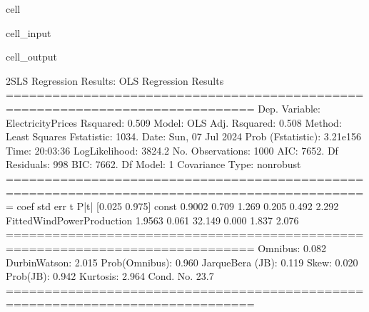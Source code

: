 \documentclass[letterpaper,10pt,english]{jupyterBook}
\begin{document}
\begin{sphinxuseclass}{cell}
\begin{sphinxVerbatimInput}
\begin{sphinxuseclass}{cell_input}
\end{sphinxuseclass}\end{sphinxVerbatimInput}
\begin{sphinxVerbatimOutput}

\begin{sphinxuseclass}{cell_output}
\begin{sphinxVerbatim}[commandchars=\\\{\}]
2SLS Regression Results:
                            OLS Regression Results                            
==============================================================================
Dep. Variable:      ElectricityPrices   R\PYGZhy{}squared:                       0.509
Model:                            OLS   Adj. R\PYGZhy{}squared:                  0.508
Method:                 Least Squares   F\PYGZhy{}statistic:                     1034.
Date:                Sun, 07 Jul 2024   Prob (F\PYGZhy{}statistic):          3.21e\PYGZhy{}156
Time:                        20:03:36   Log\PYGZhy{}Likelihood:                \PYGZhy{}3824.2
No. Observations:                1000   AIC:                             7652.
Df Residuals:                     998   BIC:                             7662.
Df Model:                           1                                         
Covariance Type:            nonrobust                                         
=============================================================================================
                                coef    std err          t      P\PYGZgt{}|t|      [0.025      0.975]
\PYGZhy{}\PYGZhy{}\PYGZhy{}\PYGZhy{}\PYGZhy{}\PYGZhy{}\PYGZhy{}\PYGZhy{}\PYGZhy{}\PYGZhy{}\PYGZhy{}\PYGZhy{}\PYGZhy{}\PYGZhy{}\PYGZhy{}\PYGZhy{}\PYGZhy{}\PYGZhy{}\PYGZhy{}\PYGZhy{}\PYGZhy{}\PYGZhy{}\PYGZhy{}\PYGZhy{}\PYGZhy{}\PYGZhy{}\PYGZhy{}\PYGZhy{}\PYGZhy{}\PYGZhy{}\PYGZhy{}\PYGZhy{}\PYGZhy{}\PYGZhy{}\PYGZhy{}\PYGZhy{}\PYGZhy{}\PYGZhy{}\PYGZhy{}\PYGZhy{}\PYGZhy{}\PYGZhy{}\PYGZhy{}\PYGZhy{}\PYGZhy{}\PYGZhy{}\PYGZhy{}\PYGZhy{}\PYGZhy{}\PYGZhy{}\PYGZhy{}\PYGZhy{}\PYGZhy{}\PYGZhy{}\PYGZhy{}\PYGZhy{}\PYGZhy{}\PYGZhy{}\PYGZhy{}\PYGZhy{}\PYGZhy{}\PYGZhy{}\PYGZhy{}\PYGZhy{}\PYGZhy{}\PYGZhy{}\PYGZhy{}\PYGZhy{}\PYGZhy{}\PYGZhy{}\PYGZhy{}\PYGZhy{}\PYGZhy{}\PYGZhy{}\PYGZhy{}\PYGZhy{}\PYGZhy{}\PYGZhy{}\PYGZhy{}\PYGZhy{}\PYGZhy{}\PYGZhy{}\PYGZhy{}\PYGZhy{}\PYGZhy{}\PYGZhy{}\PYGZhy{}\PYGZhy{}\PYGZhy{}\PYGZhy{}\PYGZhy{}\PYGZhy{}\PYGZhy{}
const                         0.9002      0.709      1.269      0.205      \PYGZhy{}0.492       2.292
FittedWindPowerProduction     1.9563      0.061     32.149      0.000       1.837       2.076
==============================================================================
Omnibus:                        0.082   Durbin\PYGZhy{}Watson:                   2.015
Prob(Omnibus):                  0.960   Jarque\PYGZhy{}Bera (JB):                0.119
Skew:                          \PYGZhy{}0.020   Prob(JB):                        0.942
Kurtosis:                       2.964   Cond. No.                         23.7
==============================================================================


\end{sphinxVerbatim}
\end{sphinxuseclass}
\end{sphinxVerbatimOutput}
\end{sphinxuseclass}
\end{document}
